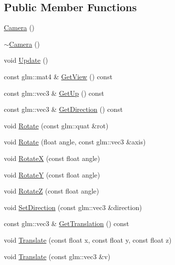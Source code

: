 \subsection*{Public Member Functions}
\begin{DoxyCompactItemize}
\item 
\mbox{\hyperlink{classngl_1_1_camera_a4b3487b40f710b295a35181896e6514b}{Camera}} ()
\item 
\mbox{\hyperlink{classngl_1_1_camera_a0d0b92e9c0291e86e6454e9f65f46ac2}{$\sim$\+Camera}} ()
\item 
void \mbox{\hyperlink{classngl_1_1_camera_a35ce10314ff19b5db20a53e3dd1df43a}{Update}} ()
\item 
const glm\+::mat4 \& \mbox{\hyperlink{classngl_1_1_camera_a1c0f11f6be1d929ec1f061f40bab9d78}{Get\+View}} () const
\item 
const glm\+::vec3 \& \mbox{\hyperlink{classngl_1_1_camera_ad38adb365c3f32e83d9f7a7222098d5c}{Get\+Up}} () const
\item 
const glm\+::vec3 \& \mbox{\hyperlink{classngl_1_1_camera_a804d7e31fde948b0c8750a92d1d7e0b3}{Get\+Direction}} () const
\item 
void \mbox{\hyperlink{classngl_1_1_camera_a9b8c318e034a25b028973aca57605e47}{Rotate}} (const glm\+::quat \&rot)
\item 
void \mbox{\hyperlink{classngl_1_1_camera_a09a263ff674c303160443f9b8b3dc188}{Rotate}} (float angle, const glm\+::vec3 \&axis)
\item 
void \mbox{\hyperlink{classngl_1_1_camera_a74a8a87c514827186f192dfc2814aa87}{RotateX}} (const float angle)
\item 
void \mbox{\hyperlink{classngl_1_1_camera_a4a0244f0332c97fdfdf088b242eb1518}{RotateY}} (const float angle)
\item 
void \mbox{\hyperlink{classngl_1_1_camera_a4c75d13cd8e269f3fb28bc63903bd4cb}{RotateZ}} (const float angle)
\item 
void \mbox{\hyperlink{classngl_1_1_camera_a746b93c1e7c0a7fea5d7c4b2e2926c15}{Set\+Direction}} (const glm\+::vec3 \&direction)
\item 
const glm\+::vec3 \& \mbox{\hyperlink{classngl_1_1_camera_a7199b6bc990cbdd41501fba153595e1d}{Get\+Translation}} () const
\item 
void \mbox{\hyperlink{classngl_1_1_camera_a53bf8a2a394f34e55549219b24b34e10}{Translate}} (const float x, const float y, const float z)
\item 
void \mbox{\hyperlink{classngl_1_1_camera_a228cffe138cb651b5fae04a09530a5f0}{Translate}} (const glm\+::vec3 \&v)

\end{DoxyCompactItemize}
